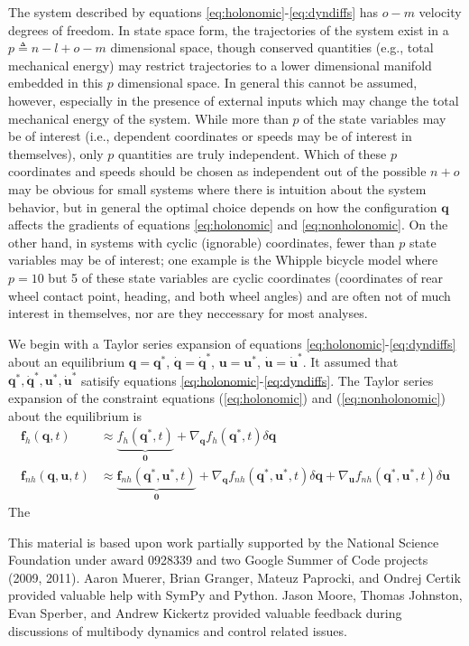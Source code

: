 \documentclass{svjour3}                     %
\begin{document}
The system described by equations \ref{eq:holonomic}-\ref{eq:dyndiffs} has
$o-m$ velocity degrees of freedom.  In state space form, the trajectories of
the system exist in a $p \triangleq n - l + o - m$ dimensional space, though
conserved quantities (e.g., total mechanical energy) may restrict trajectories
to a lower dimensional manifold embedded in this $p$ dimensional space.  In
general this cannot be assumed, however, especially in the presence of external
inputs which may change the total mechanical energy of the system.  While more
than $p$ of the state variables may be of interest (i.e., dependent coordinates
or speeds may be of interest in themselves), only $p$ quantities are truly
independent.  Which of these $p$ coordinates and speeds should be chosen as
independent out of the possible $n + o$ may be obvious for small systems where
there is intuition about the system behavior, but in general the optimal choice
depends on how the configuration $\bm{q}$ affects the gradients of equations
\ref{eq:holonomic} and \ref{eq:nonholonomic}.  On the other hand, in systems
with cyclic (ignorable) coordinates, fewer than $p$ state variables may be of
interest; one example is the Whipple bicycle model where $p=10$ but 5 of these
state variables are cyclic coordinates (coordinates of rear wheel contact
point, heading, and both wheel angles) and are often not of much interest in
themselves, nor are they neccessary for most analyses.

We begin with a Taylor series expansion of equations
\ref{eq:holonomic}-\ref{eq:dyndiffs} about an equilibrium $\bm{q}=\bm{q}^*$,
$\bm{\dot{q}}=\bm{\dot{q}}^*$, $\bm{u}=\bm{u}^*$,
$\bm{\dot{u}}=\bm{\dot{u}}^*$.  It assumed that $\bm{q}^*, \bm{\dot{q}}^*,
\bm{u}^*, \bm{\dot{u}}^*$ satisify equations
\ref{eq:holonomic}-\ref{eq:dyndiffs}.  The Taylor series expansion of the
constraint equations (\ref{eq:holonomic}) and (\ref{eq:nonholonomic}) about the
equilibrium is
\begin{align}
  \label{eq:holonomic_expansion}
  \bm{f}_{h}(\bm{q}, t) &\approx \underbrace{f_{h}(\bm{q}^*, t)}_{\bm{0}} +
    \nabla_{\bm{q}}f_{h}(\bm{q}^*, t)\delta \bm{q}\\
  \label{eq:nonholonomic_expansion}
  \bm{f}_{nh}(\bm{q}, \bm{u}, t) &\approx \underbrace{\bm{f}_{nh}(\bm{q}^*,
  \bm{u}^*, t)}_{\bm{0}} +  \nabla_{\bm{q}}f_{nh}(\bm{q}^*, \bm{u}^*, t)\delta \bm{q} + \nabla_{\bm{u}}f_{nh}(\bm{q}^*, \bm{u}^*, t)\delta \bm{u}
\end{align}
The 


\begin{acknowledgements}
  This material is based upon work partially supported by the National Science
  Foundation under award 0928339 and two Google Summer of Code projects (2009,
  2011).  Aaron Muerer, Brian Granger, Mateuz Paprocki, and Ondrej Certik
  provided valuable help with SymPy and Python.  Jason Moore, Thomas Johnston,
  Evan Sperber, and Andrew Kickertz provided valuable feedback during
  discussions of multibody dynamics and control related issues.
\end{acknowledgements}
\end{document}
